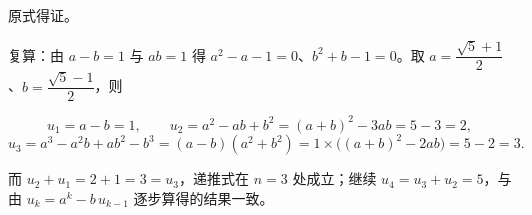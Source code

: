 \begin{answer}
原式得证。

复算：由 $a-b=1$ 与 $ab=1$ 得 $a^2-a-1=0$、$b^2+b-1=0$。取 $a=\dfrac{\sqrt5+1}{2}$、$b=\dfrac{\sqrt5-1}{2}$，则

\nopagebreak[4]
\[
u_1=a-b=1,\qquad
u_2=a^2-ab+b^2=(a+b)^2-3ab=5-3=2,
\]
\nopagebreak[4]
\[
u_3=a^3-a^2b+ab^2-b^3=(a-b)(a^2+b^2)=1\times\bigl((a+b)^2-2ab\bigr)=5-2=3.
\]

而 $u_2+u_1=2+1=3=u_3$，递推式在 $n=3$ 处成立；继续 $u_4=u_3+u_2=5$，与由 $u_k=a^k-b\,u_{k-1}$ 逐步算得的结果一致。



\end{answer}
